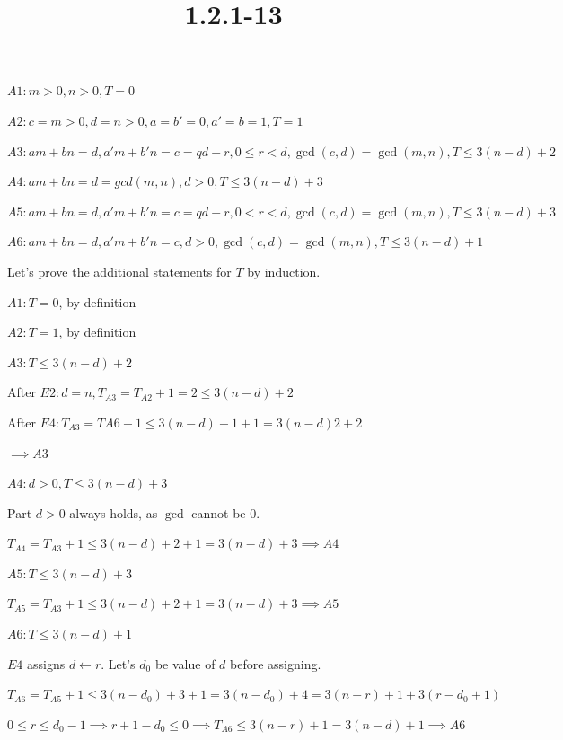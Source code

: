 \documentclass{article}
\title{1.2.1-13}
\begin{document}
\maketitle

\( A1: m > 0, n > 0, T = 0 \)

\( A2: c = m > 0, d = n > 0, a = b' = 0, a' = b = 1, T = 1 \)

\( A3: am + bn = d, a'm + b'n = c = qd + r, 0 \leq r < d, \gcd(c, d) = \gcd(m, n), T \leq 3(n-d) + 2 \)

\( A4: am + bn = d = gcd(m, n), d > 0, T \leq 3(n - d) + 3 \)

\( A5: am + bn = d, a'm + b'n = c = qd + r, 0 < r < d, \gcd(c, d) = \gcd(m, n), T \leq 3(n-d) + 3 \)

\( A6: am + bn = d, a'm + b'n = c, d > 0, \gcd(c, d) = \gcd(m, n), T \leq 3(n-d) + 1 \)

Let's prove the additional statements for \( T \) by induction.

\( A1: T = 0 \), by definition

\( A2: T=1 \), by definition

\( A3: T \leq 3(n-d)+2 \)

After \( E2: d=n, T_{A3}=T_{A2} + 1 = 2 \leq 3(n-d) + 2 \)

After \( E4: T_{A3} = T{A6} + 1 \leq 3(n-d)+1+1 = 3(n-d)2 + 2 \)

\( \implies A3 \)

\( A4: d > 0, T \leq 3(n-d)+3 \)

Part \( d > 0 \) always holds, as \( \gcd \) cannot be \( 0 \).

\( T_{A4} = T_{A3} + 1 \leq 3(n - d)+2 + 1 = 3(n-d)+3 \implies A4 \)

\( A5: T \leq 3(n-d) + 3 \)

\( T_{A5} = T_{A3} + 1 \leq 3(n - d)+2 + 1 = 3(n-d)+3 \implies A5 \)

\( A6: T \leq 3(n-d)+1 \)

\( E4 \) assigns \( d \leftarrow r \). Let's \( d_0 \) be value of \( d \) before assigning.

\( T_{A6} = T_{A5} + 1 \leq 3(n-d_0)+3+1 = 3(n-d_0)+4 = 3(n-r)+1+3(r-d_0+1) \)

\( 0 \leq r \leq d_0 - 1 \implies r + 1 - d_0 \leq 0 \implies T_{A6} \leq 3(n-r)+1 = 3(n-d)+1 \implies A6 \)
\end{document}
